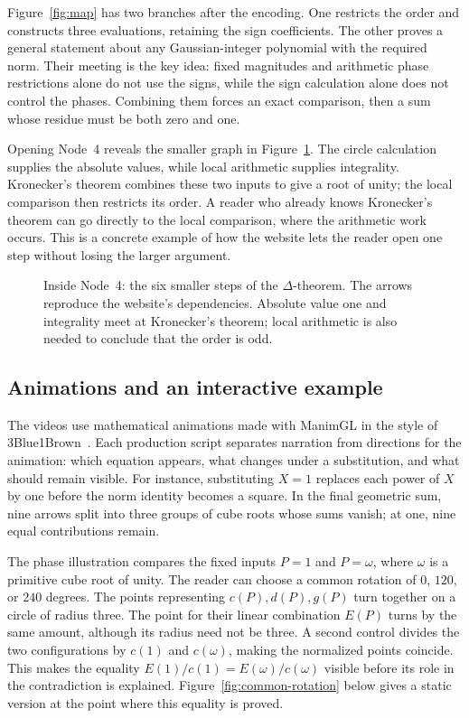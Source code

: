 \documentclass[11pt]{article}
\begin{document}
Figure~\ref{fig:map} has two branches after the encoding. One restricts the
order and constructs three evaluations, retaining the sign coefficients.
The other proves a general statement about any Gaussian-integer polynomial
with the required norm. Their meeting is the key idea: fixed magnitudes
and arithmetic phase restrictions alone do not use the signs, while the
sign calculation alone does not control the phases. Combining them forces
an exact comparison, then a sum whose residue must be both zero and one.

\begin{samepage}
Opening Node~4 reveals the smaller graph in Figure~\ref{fig:delta-detail}.
The circle calculation supplies the absolute values, while local arithmetic
supplies integrality. Kronecker's theorem combines these two inputs to give
a root of unity; the local comparison then restricts its order. A reader
who already knows Kronecker's theorem can go directly to the local
comparison, where the arithmetic work occurs. This is a concrete example
of how the website lets the reader open one step without losing the larger
argument.
\par
\end{samepage}

\begin{figure}[htbp]
 \centering
 
 \caption{Inside Node~4: the six smaller steps of the $\Delta$-theorem.
 The arrows reproduce the website's dependencies. Absolute value one and
 integrality meet at Kronecker's theorem; local arithmetic is also needed
 to conclude that the order is odd.}%
 \label{fig:delta-detail}
\end{figure}

\subsection{Animations and an interactive example}

The videos use mathematical animations made with ManimGL in the style of
3Blue1Brown~\cite{manimgl}. Each production script separates narration from
directions for the animation: which equation appears, what changes under
a substitution, and what should remain visible. For instance, substituting
$X=1$ replaces each power of $X$ by one before the norm identity becomes
a square. In the final geometric sum, nine arrows split into three groups
of cube roots whose sums vanish; at one, nine equal contributions remain.

The phase illustration compares the fixed inputs $P=1$ and $P=\omega$,
where $\omega$ is a primitive cube root of unity. The reader can choose a
common rotation of $0$, $120$, or $240$ degrees. The points representing
$c(P),d(P),g(P)$ turn together on a circle of radius three. The point for
their linear combination $E(P)$ turns by the same amount, although its
radius need not be three. A second control divides the two configurations
by $c(1)$ and $c(\omega)$, making the normalized points coincide.
This makes the equality $E(1)/c(1)=E(\omega)/c(\omega)$ visible before
its role in the contradiction is explained. Figure~\ref{fig:common-rotation}
below gives a static version at the point where this equality is proved.
\end{document}
